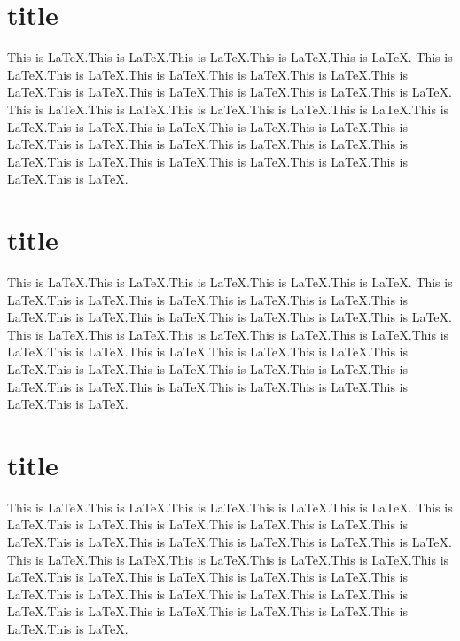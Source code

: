 \documentclass{article}
\begin{document}
\section{title}
This is LaTeX.This is LaTeX.This is LaTeX.This is LaTeX.This is LaTeX.
This is LaTeX.This is LaTeX.This is LaTeX.This is LaTeX.This is LaTeX.This is LaTeX.This is LaTeX.This is LaTeX.This is LaTeX.This is LaTeX.This is LaTeX.
This is LaTeX.This is LaTeX.This is LaTeX.This is LaTeX.This is LaTeX.This is LaTeX.This is LaTeX.This is LaTeX.This is LaTeX.This is LaTeX.This is LaTeX.This is LaTeX.This is LaTeX.This is LaTeX.This is LaTeX.This is LaTeX.This is LaTeX.This is LaTeX.This is LaTeX.This is LaTeX.This is LaTeX.This is LaTeX.

\section{title}
This is LaTeX.This is LaTeX.This is LaTeX.This is LaTeX.This is LaTeX.
This is LaTeX.This is LaTeX.This is LaTeX.This is LaTeX.This is LaTeX.This is LaTeX.This is LaTeX.This is LaTeX.This is LaTeX.This is LaTeX.This is LaTeX.
This is LaTeX.This is LaTeX.This is LaTeX.This is LaTeX.This is LaTeX.This is LaTeX.This is LaTeX.This is LaTeX.This is LaTeX.This is LaTeX.This is LaTeX.This is LaTeX.This is LaTeX.This is LaTeX.This is LaTeX.This is LaTeX.This is LaTeX.This is LaTeX.This is LaTeX.This is LaTeX.This is LaTeX.This is LaTeX.

\section{title}
This is LaTeX.This is LaTeX.This is LaTeX.This is LaTeX.This is LaTeX.
This is LaTeX.This is LaTeX.This is LaTeX.This is LaTeX.This is LaTeX.This is LaTeX.This is LaTeX.This is LaTeX.This is LaTeX.This is LaTeX.This is LaTeX.
This is LaTeX.This is LaTeX.This is LaTeX.This is LaTeX.This is LaTeX.This is LaTeX.This is LaTeX.This is LaTeX.This is LaTeX.This is LaTeX.This is LaTeX.This is LaTeX.This is LaTeX.This is LaTeX.This is LaTeX.This is LaTeX.This is LaTeX.This is LaTeX.This is LaTeX.This is LaTeX.This is LaTeX.This is LaTeX.
\end{document}
